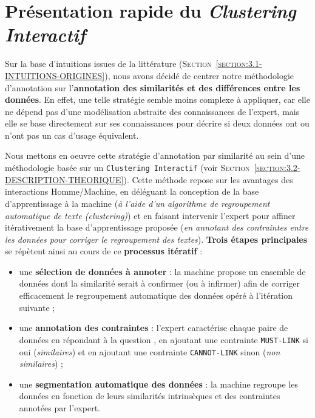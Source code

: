 	
	\newpage
	\section{Présentation rapide du \textit{Clustering Interactif}}
		\label{section:5.1-GUIDE-PRESENTATION-RAPIDE}
		
		Sur la base d'intuitions issues de la littérature (\textsc{Section~\ref{section:3.1-INTUITIONS-ORIGINES}}), nous avons décidé de centrer notre méthodologie d'annotation sur l'\textbf{annotation des similarités et des différences entre les données}.
		En effet, une telle stratégie semble moins complexe à appliquer, car elle ne dépend pas d'une modélisation abstraite des connaissances de l'expert, mais elle se base directement sur ses connaissances pour décrire si deux données ont ou n'ont pas un cas d'usage équivalent.
		
		Nous mettons en oeuvre cette stratégie d'annotation par similarité au sein d'une méthodologie basée sur un \texttt{Clustering Interactif} (voir \textsc{Section~\ref{section:3.2-DESCRIPTION-THEORIQUE}}).
		Cette méthode repose sur les avantages des interactions Homme/Machine, en déléguant la conception de la base d'apprentissage à la machine (\textit{à l'aide d'un algorithme de regroupement automatique de texte (clustering)}) et en faisant intervenir l'expert pour affiner itérativement la base d'apprentissage proposée (\textit{en annotant des contraintes entre les données pour corriger le regroupement des textes}).
		\textbf{Trois étapes principales} se répètent ainsi au cours de ce \textbf{processus itératif} :
		\begin{itemize}
			\item une \textbf{sélection de données à annoter} :
			la machine propose un ensemble de données dont la similarité serait à confirmer (ou à infirmer) afin de corriger efficacement le regroupement automatique des données opéré à l'itération suivante ;
			\item une \textbf{annotation des contraintes} :
			l'expert caractérise chaque paire de données en répondant à la question , en ajoutant une contrainte \texttt{MUST-LINK} si oui (\textit{similaires}) et en ajoutant une contrainte \texttt{CANNOT-LINK} sinon (\textit{non similaires}) ;
			\item une \textbf{segmentation automatique des données} : la machine regroupe les données en fonction de leurs similarités intrinsèques et des contraintes annotées par l'expert.
		\end{itemize}
		
